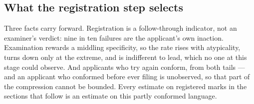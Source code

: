 \subsection{What the registration step selects}\label{sec:reg_conclusion}

Three facts carry forward. Registration is a follow-through indicator,
not an examiner's verdict: nine in ten failures are the applicant's own
inaction. Examination rewards a middling specificity, so the rate rises
with atypicality, turns down only at the extreme, and is indifferent to
lead, which no one at this stage could observe. And applicants who try
again conform, from both tails --- and an applicant who conformed before
ever filing is unobserved, so that part of the compression cannot be
bounded. Every estimate on registered marks in the sections that follow
is an estimate on this partly conformed language.
